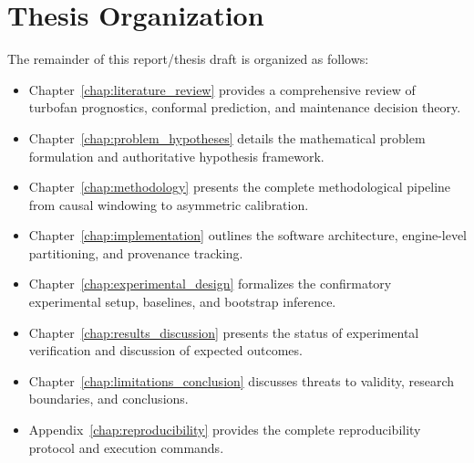 \section{Thesis Organization}
The remainder of this report/thesis draft is organized as follows:
\begin{itemize}
    \item Chapter~\ref{chap:literature_review} provides a comprehensive review of turbofan prognostics, conformal prediction, and maintenance decision theory.
    \item Chapter~\ref{chap:problem_hypotheses} details the mathematical problem formulation and authoritative hypothesis framework.
    \item Chapter~\ref{chap:methodology} presents the complete methodological pipeline from causal windowing to asymmetric calibration.
    \item Chapter~\ref{chap:implementation} outlines the software architecture, engine-level partitioning, and provenance tracking.
    \item Chapter~\ref{chap:experimental_design} formalizes the confirmatory experimental setup, baselines, and bootstrap inference.
    \item Chapter~\ref{chap:results_discussion} presents the status of experimental verification and discussion of expected outcomes.
    \item Chapter~\ref{chap:limitations_conclusion} discusses threats to validity, research boundaries, and conclusions.
    \item Appendix~\ref{chap:reproducibility} provides the complete reproducibility protocol and execution commands.
\end{itemize}
